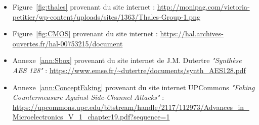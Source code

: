 \documentclass[oneside]{book}
\makeatletter
\newcommand{\dummy@addcontentsline}[3]{}
\newcommand{\DeactivateToc}{\let\addcontentsline\dummy@addcontentsline}
\makeatother
\begin{document}
\begin{itemize}

\item Figure~\ref{fig:thales} provenant du site internet :
\url{http://monipag.com/victoria-petitier/wp-content/uploads/sites/1363/Thales-Group-1.png}

\item Figure~\ref{fig:CMOS} provenant du site internet :
\url{https://hal.archives-ouvertes.fr/hal-00753215/document}

\item Annexe~\ref{ann:Sbox} provenant du site internet de J.M. Dutertre \textit{"Synthèse AES 128"} :
\url{https://www.emse.fr/~dutertre/documents/synth_AES128.pdf}

\item Annexe~\ref{ann:ConceptFaking} provenant du site internet UPCommons \textit{"Faking Countermeasure Against Side-Channel Attacks"} :
\url{https://upcommons.upc.edu/bitstream/handle/2117/112973/Advances_in_Microelectronics_V_1_chapter19.pdf?sequence=1}

\end{itemize}


{}

\nocite{*}




\newpage
\lhead{}
\DeactivateToc
\end{document}
